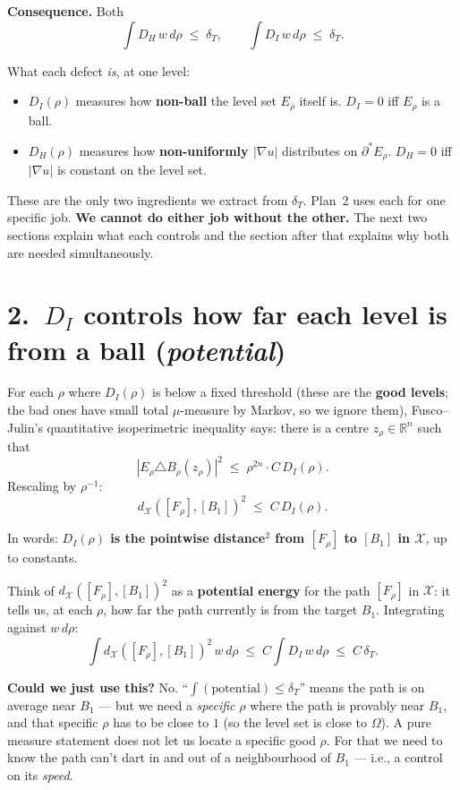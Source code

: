 \documentclass[11pt,a4paper]{article}
\newcommand{\R}{\mathbb{R}}
\newcommand{\X}{\mathcal{X}}
\newcommand{\Erho}{E_\rho}
\newcommand{\Frho}{F_\rho}
\newcommand{\deltaT}{\delta_T}
\newcommand{\dX}{d_{\X}}
\begin{document}
\textbf{Consequence.} Both
\[
\int D_H\, w\, d\rho \;\le\; \deltaT, \qquad \int D_I\, w\, d\rho \;\le\; \deltaT.
\]

What each defect \emph{is}, at one level:
\begin{itemize}[leftmargin=*,itemsep=1pt]
\item $D_I(\rho)$ measures how \textbf{non-ball} the level set $\Erho$ itself is. $D_I = 0$ iff $\Erho$ is a ball.
\item $D_H(\rho)$ measures how \textbf{non-uniformly $|\nabla u|$} distributes on $\partial^* \Erho$. $D_H = 0$ iff $|\nabla u|$ is constant on the level set.
\end{itemize}

These are the only two ingredients we extract from $\deltaT$. Plan~2 uses each for one specific job. \textbf{We cannot do either job without the other.} The next two sections explain what each controls and the section after that explains why both are needed simultaneously.

\section*{2.\ $D_I$ controls how far each level is from a ball (\emph{potential})}

For each $\rho$ where $D_I(\rho)$ is below a fixed threshold (these are the \textbf{good levels}; the bad ones have small total $\mu$-measure by Markov, so we ignore them), Fusco--Julin's quantitative isoperimetric inequality says: there is a centre $z_\rho \in \R^n$ such that
\[
|\Erho \triangle B_\rho(z_\rho)|^2 \;\le\; \rho^{2n}\cdot C\, D_I(\rho).
\]
Rescaling by $\rho^{-1}$:
\[
\boxed{\dX([\Frho],[B_1])^2 \;\le\; C\, D_I(\rho).}
\]

In words: \textbf{$D_I(\rho)$ is the pointwise distance$^2$ from $[\Frho]$ to $[B_1]$ in $\X$}, up to constants.

Think of $\dX([\Frho],[B_1])^2$ as a \textbf{potential energy} for the path $[\Frho]$ in $\X$: it tells us, at each $\rho$, how far the path currently is from the target $B_1$. Integrating against $w\, d\rho$:
\[
\int \dX([\Frho],[B_1])^2 \, w\, d\rho \;\le\; C \int D_I \, w\, d\rho \;\le\; C\,\deltaT.
\]

\textbf{Could we just use this?} No. ``$\int (\text{potential}) \le \deltaT$'' means the path is on average near $B_1$ --- but we need a \emph{specific} $\rho$ where the path is provably near $B_1$, and that specific $\rho$ has to be close to $1$ (so the level set is close to $\Omega$). A pure measure statement does not let us locate a specific good $\rho$. For that we need to know the path can't dart in and out of a neighbourhood of $B_1$ --- i.e., a control on its \emph{speed}.
\end{document}
